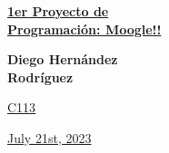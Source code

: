 \documentclass{article}
\begin{document}
	
\begin{center}
	
	\underline{\textbf{\Huge 1er Proyecto de}}\\
	\vspace{0.5cm}	
	\underline{\textbf{\Huge Programación: Moogle!!}}\\
	
	\vspace{3.3cm}
	
	\textbf{\Huge Diego Hernández}\\
	\vspace{0.5cm}	
	\textbf{\Huge Rodríguez}\\
	
	\vspace{2.3cm}
	
	\underline{\Huge C113}\\
	
	\vspace{3.3cm}
	
	\underline{\Huge July 21st, 2023}\\
	
\end{center}
	
\end{document}
